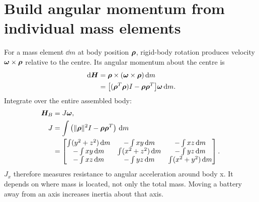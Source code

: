 \section{Build angular momentum from individual mass elements}
For a mass element $\dd m$ at body position $\bm{\rho}$, rigid-body rotation
produces velocity $\bm{\omega}\times\bm{\rho}$ relative to the centre. Its angular
momentum about the centre is
\begin{align}
\,\mathrm d\bm{H}&=\bm{\rho}\times(\bm{\omega}\times\bm{\rho})\,\mathrm d m\\
&=\bigl[(\bm{\rho}^T\bm{\rho})I-\bm{\rho}\bm{\rho}^T\bigr]\bm{\omega}\,\mathrm d m.
\end{align}
Integrate over the entire assembled body:
\begin{align}
\bm{H}_B&=J\bm{\omega},\\
J&=\int\left(\|\bm{\rho}\|^2I-\bm{\rho}\bm{\rho}^T\right)\,\mathrm d m\\
&=\begin{bmatrix}
\int(y^2+z^2)\,\mathrm d m&-\int xy\,\mathrm d m&-\int xz\,\mathrm d m\\
-\int xy\,\mathrm d m&\int(x^2+z^2)\,\mathrm d m&-\int yz\,\mathrm d m\\
-\int xz\,\mathrm d m&-\int yz\,\mathrm d m&\int(x^2+y^2)\,\mathrm d m
\end{bmatrix}.
\end{align}
$J_x$ therefore measures resistance to angular acceleration around body x.
It depends on where mass is located, not only the total mass. Moving a battery
away from an axis increases inertia about that axis.

